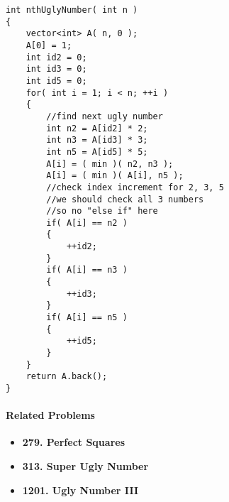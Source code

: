 \setcounter{lstlisting}{0}
\begin{lstlisting}[style=customc, caption={Dynamic Programming}]
int nthUglyNumber( int n )
{
    vector<int> A( n, 0 );
    A[0] = 1;
    int id2 = 0;
    int id3 = 0;
    int id5 = 0;
    for( int i = 1; i < n; ++i )
    {
        //find next ugly number
        int n2 = A[id2] * 2;
        int n3 = A[id3] * 3;
        int n5 = A[id5] * 5;
        A[i] = ( min )( n2, n3 );
        A[i] = ( min )( A[i], n5 );
        //check index increment for 2, 3, 5
        //we should check all 3 numbers
        //so no "else if" here
        if( A[i] == n2 )
        {
            ++id2;
        }
        if( A[i] == n3 )
        {
            ++id3;
        }
        if( A[i] == n5 )
        {
            ++id5;
        }
    }
    return A.back();
}
\end{lstlisting}

\paragraph{Related Problems}
\begin{itemize}
\item \textbf{279. Perfect Squares}
\item \textbf{313. Super Ugly Number}
\item \textbf{1201. Ugly Number III}
\end{itemize}